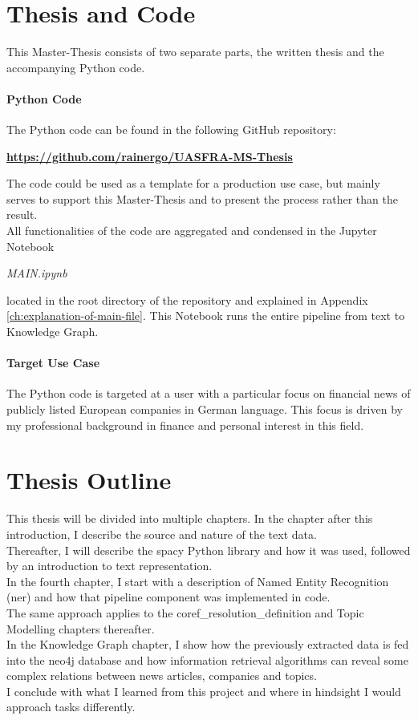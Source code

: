 \section{Thesis and Code}\label{sec:domain-focus}
This Master-Thesis consists of two separate parts, the written thesis and the accompanying Python code.

\paragraph{Python Code}
The Python code can be found in the following GitHub repository:
\begin{center}
	\textbf{\url{https://github.com/rainergo/UASFRA-MS-Thesis}}
\end{center}
The code could be used as a template for a production use case, but mainly serves to support this Master-Thesis and to present the process rather than the result.\\
All functionalities of the code are aggregated and condensed in the Jupyter Notebook
\begin{center}
	\emph{MAIN.ipynb}
\end{center}
located in the root directory of the repository and explained in Appendix \ref{ch:explanation-of-main-file}.
This Notebook runs the entire pipeline from text to Knowledge Graph.

\paragraph{Target Use Case}
The Python code is targeted at a user with a particular focus on financial news of publicly listed European companies in German language.
This focus is driven by my professional background in finance and personal interest in this field.

\section{Thesis Outline}\label{sec:thesis-outline}
This thesis will be divided into multiple chapters.
In the chapter after this introduction, I describe the source and nature of the text data.\\
Thereafter, I will describe the spacy \cite{spacy} Python library and how it was used, followed by an introduction to text representation.\\
In the fourth chapter, I start with a description of Named Entity Recognition (\gls{ner}) and how that pipeline component was implemented in code.\\
The same approach applies to the \gls{coref_resolution_definition} and Topic Modelling chapters thereafter.\\
In the Knowledge Graph chapter, I show how the previously extracted data is fed into the neo4j database and how information retrieval algorithms can reveal some complex relations between news articles, companies and topics.\\
I conclude with what I learned from this project and where in hindsight I would approach tasks differently.